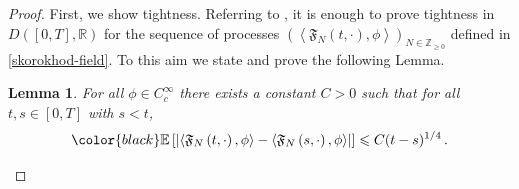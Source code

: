 \documentclass[a4paper,11pt,oneside,reqno]{amsart}
\newtheorem{lemma}[theorem]{Lemma}
\theoremstyle{definition}
\renewcommand{\leq}{\leqslant}
\renewcommand{\geq}{\geqslant}
\numberwithin{equation}{section}
\begin{document}
\begin{proof} 
First, we show tightness. Referring to \cite{mitoma}, it is enough to prove tightness in $D([0,T],\mathbb{R})$ for the sequence of processes $(\left\langle \mathfrak{F}_{N}\left(t,\cdot\right),\phi\right\rangle)_{N\in \mathbb{Z}_{\geq 0}} $ defined in \eqref{skorokhod-field}. To this aim we state and prove the following Lemma. 
\begin{lemma}\label{Lemma5-2}
	For all $\phi\in C_{c}^{\infty}$  there exists a constant $C>0$  such that  for all  $t,s\in[0,T]$ with $s<t$,
	\begin{equation}\label{estimate}
			{\color{black}\mathbb{E}\left[\left|\left\langle \mathfrak{F}_{N}\left(t,\cdot\right),\phi\right\rangle-\left\langle \mathfrak{F}_{N}\left(s,\cdot\right),\phi\right\rangle\right|\right]\leq C (t-s)^{1/4}}\,.
	\end{equation}
\end{lemma}


\end{proof}
\end{document}
